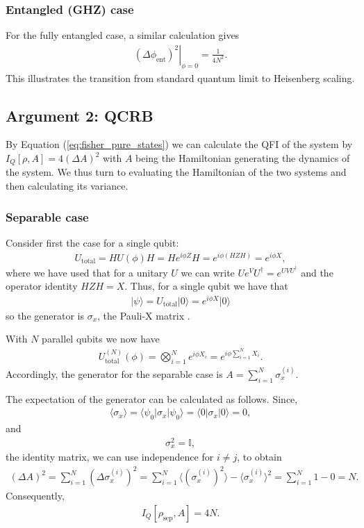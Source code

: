 \subsubsection{Entangled (GHZ) case}
For the fully entangled case, a similar calculation gives
\begin{align}
    \left. (\Delta\phi_\text{ent})^2\right|_{\phi=0} =\frac{1}{4N^2}.
\end{align}
This illustrates the transition from standard quantum limit to Heisenberg scaling.

\subsection{Argument 2: QCRB}
\label{sec:arg2}

By Equation (\ref{eq:fisher_pure_states}) we can calculate the QFI of the system by $I_Q[\rho, A]=4(\Delta A)^2$ with $A$ 
being the Hamiltonian generating the dynamics of the system. We thus turn to evaluating the Hamiltonian of the two systems
and then calculating its variance.

\subsubsection{Separable case}
Consider first the case for a single qubit:
\begin{align}
U_\text{total} = H U(\phi) H = H e^{i \phi Z} H = e^{i\phi(HZH)}=e^{i\phi X},
\end{align}
where we have used that for a unitary $U$ we can write $Ue^V U^\dagger=e^{U V U^\dagger}$ and the operator identity $HZH=X$.
Thus, for a single qubit we have that
\begin{align}
    | \psi \rangle = U_\text{total} |0\rangle = e^{i \phi X} |0\rangle
\end{align}
so the generator is $\sigma_x$, the Pauli-X matrix \cite{pauliZurQuantenmechanikMagnetischen1927}.

With $N$ parallel qubits we now have
\begin{align}
    U_\text{total}^{(N)}(\phi) = \bigotimes_{i=1}^N e^{i\phi X_i} = e^{i\phi \sum_{i=1}^N X_i}.
\end{align}
Accordingly, the generator for the separable case is $A=\sum_{i=1}^N \sigma_x^{(i)}$.

The expectation of the generator can be calculated as follows. Since,
\begin{align}
    \langle \sigma_x \rangle = \langle \psi_0 | \sigma_x | \psi_0 \rangle 
    = \langle 0 | \sigma_x | 0 \rangle = 0,
\end{align}
and
\begin{align}
    \sigma_x^2 = \mathbb I,
\end{align}
the identity matrix, we can use independence for $i\neq j$, to obtain
\begin{align}
    (\Delta A)^2 
    = \sum_{i=1}^N (\Delta \sigma_x^{(i)})^2
    = \sum_{i=1}^N \langle \left(\sigma_x^{(i)}\right)^2 \rangle - \langle \sigma_x^{(i)} \rangle^2
    = \sum_{i=1}^N 1 - 0
    = N.
\end{align}
Consequently,
\begin{align}
I_Q[\rho_{\text{sep}}, A] = 4N.
\end{align}

